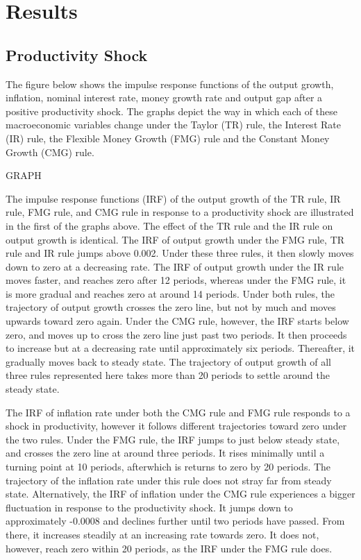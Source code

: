 \documentclass[11pt,preprint, authoryear]{elsarticle}
\numberwithin{equation}{section}
\numberwithin{figure}{section}
\numberwithin{table}{section}
\begin{document}
\newpage

\hypertarget{results}{%
\section{Results}\label{results}}

\hypertarget{productivity-shock}{%
\subsection{Productivity Shock}\label{productivity-shock}}

The figure below shows the impulse response functions of the output
growth, inflation, nominal interest rate, money growth rate and output
gap after a positive productivity shock. The graphs depict the way in
which each of these macroeconomic variables change under the Taylor (TR)
rule, the Interest Rate (IR) rule, the Flexible Money Growth (FMG) rule
and the Constant Money Growth (CMG) rule.

GRAPH

The impulse response functions (IRF) of the output growth of the TR
rule, IR rule, FMG rule, and CMG rule in response to a productivity
shock are illustrated in the first of the graphs above. The effect of
the TR rule and the IR rule on output growth is identical. The IRF of
output growth under the FMG rule, TR rule and IR rule jumps above 0.002.
Under these three rules, it then slowly moves down to zero at a
decreasing rate. The IRF of output growth under the IR rule moves
faster, and reaches zero after 12 periods, whereas under the FMG rule,
it is more gradual and reaches zero at around 14 periods. Under both
rules, the trajectory of output growth crosses the zero line, but not by
much and moves upwards toward zero again. Under the CMG rule, however,
the IRF starts below zero, and moves up to cross the zero line just past
two periods. It then proceeds to increase but at a decreasing rate until
approximately six periods. Thereafter, it gradually moves back to steady
state. The trajectory of output growth of all three rules represented
here takes more than 20 periods to settle around the steady state.

The IRF of inflation rate under both the CMG rule and FMG rule responds
to a shock in productivity, however it follows different trajectories
toward zero under the two rules. Under the FMG rule, the IRF jumps to
just below steady state, and crosses the zero line at around three
periods. It rises minimally until a turning point at 10 periods,
afterwhich is returns to zero by 20 periods. The trajectory of the
inflation rate under this rule does not stray far from steady state.
Alternatively, the IRF of inflation under the CMG rule experiences a
bigger fluctuation in response to the productivity shock. It jumps down
to approximately -0.0008 and declines further until two periods have
passed. From there, it increases steadily at an increasing rate towards
zero. It does not, however, reach zero within 20 periods, as the IRF
under the FMG rule does.
\end{document}
